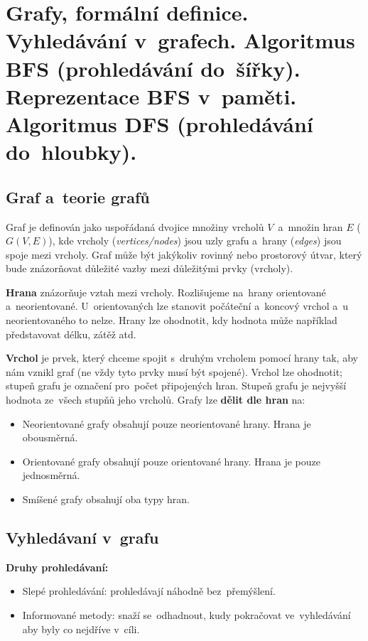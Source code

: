 \clearpage
\section{Grafy, formální definice. Vyhledávání v~grafech. Algoritmus BFS (prohledávání do~šířky). Reprezentace BFS v~paměti. Algoritmus DFS (prohledávání do~hloubky).}

\subsection{Graf a~teorie grafů}

Graf je definován jako uspořádaná dvojice množiny vrcholů \( V \)~a~množin hran \( E \) (\( G(V,E) \)), kde vrcholy (\emph{vertices/nodes}) jsou uzly grafu a~hrany (\emph{edges}) jsou spoje mezi vrcholy. Graf může být jakýkoliv rovinný nebo prostorový útvar, který bude znázorňovat důležité vazby mezi důležitými prvky (vrcholy).

\textbf{Hrana} znázorňuje vztah mezi vrcholy. Rozlišujeme na~hrany orientované a~neorientované. U~orientovaných lze stanovit počáteční a~koncový vrchol a~u neorientovaného to nelze. Hrany lze ohodnotit, kdy hodnota může například představovat délku, zátěž atd.

\textbf{Vrchol} je prvek, který chceme spojit s~druhým vrcholem pomocí hrany tak, aby nám vznikl graf (ne vždy tyto prvky musí být spojené). Vrchol lze ohodnotit; stupeň grafu je označení pro~počet připojených hran. Stupeň grafu je nejvyšší hodnota ze~všech stupňů jeho vrcholů. Grafy lze \textbf{dělit dle hran} na:

\begin{itemize}
	\item Neorientované grafy obsahují pouze neorientované hrany. Hrana je obousměrná.
	\item Orientované grafy obsahují pouze orientované hrany. Hrana je pouze jednosměrná.
	\item Smíšené grafy obsahují oba typy hran.
\end{itemize}

\subsection{Vyhledávaní v~grafu}

\textbf{Druhy prohledávaní:}
\begin{itemize}
	\item Slepé prohledávání: prohledávají náhodně bez~přemýšlení.
	\item Informované metody: snaží se~odhadnout, kudy pokračovat ve~vyhledávání aby byly co nejdříve v~cíli.
\end{itemize}

